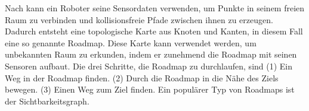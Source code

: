 %
Nach \cite{Principles:05} kann ein Roboter seine Sensordaten verwenden, um Punkte in seinem freien Raum zu verbinden und kollisionsfreie Pfade zwischen ihnen zu erzeugen. Dadurch entsteht eine topologische Karte aus Knoten und Kanten, in diesem Fall eine so genannte Roadmap. Diese Karte kann verwendet werden, um unbekannten Raum zu erkunden, indem er zunehmend die Roadmap mit seinen Sensoren aufbaut.
Die drei Schritte, die Roadmap zu durchlaufen, sind (1) Ein Weg in der Roadmap finden. (2) Durch die Roadmap in die Nähe des Ziels bewegen. (3) Einen Weg zum Ziel finden.
Ein populärer Typ von Roadmaps ist der Sichtbarkeitsgraph.


